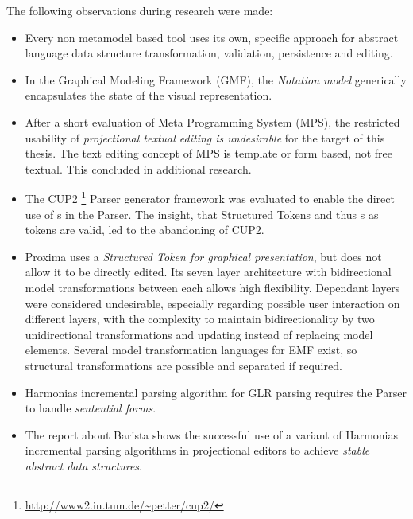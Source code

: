 The following observations during research were made:
\begin{itemize}
	\item Every non metamodel based tool uses its own, specific approach for abstract language data structure transformation, validation, persistence and editing.
	\item In the Graphical Modeling Framework (GMF), the \emph{Notation model} generically encapsulates the state of the visual representation.
	\item After a short evaluation of Meta Programming System (MPS), the restricted usability of \emph{projectional textual editing is undesirable} for the target of this thesis. The text editing concept of MPS is template or form based, not free textual. This concluded in additional research.
	\item The CUP2 \footnote{\raggedright \url{http://www2.in.tum.de/~petter/cup2/}} Parser generator framework was evaluated to enable the direct use of s in the Parser. The insight, that Structured Tokens and thus s as tokens are valid, led to the abandoning of CUP2. 
	\item Proxima uses a \emph{Structured Token for graphical presentation}, but does not allow it to be directly edited.  Its seven layer architecture with bidirectional model transformations between each allows high flexibility. Dependant layers were considered undesirable, especially regarding possible user interaction on different layers, with the complexity to maintain bidirectionality by two unidirectional transformations and updating instead of replacing model elements. Several model transformation languages for EMF exist, so structural transformations are possible and separated if required. 
		\item Harmonias incremental parsing algorithm for GLR parsing requires the Parser to handle \emph{sentential forms}.
		\item The report \cite{Barista} about Barista shows the successful use of a variant of Harmonias incremental parsing algorithms in projectional editors to achieve \emph{stable abstract data structures}.
\end{itemize}


